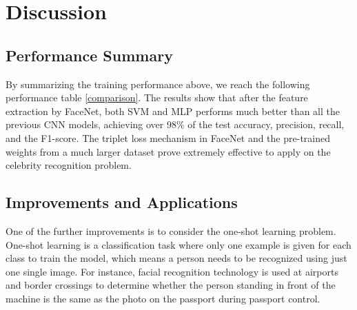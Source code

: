 \section{Discussion}
\subsection{Performance Summary}
By summarizing the training performance above, we reach the following performance table \ref{comparison}. The results show that after the feature extraction by FaceNet, both SVM and MLP performs much better than all the previous CNN models, achieving over 98\% of the test accuracy, precision, recall, and the F1-score. The triplet loss mechanism in FaceNet and the pre-trained weights from a much larger dataset prove extremely effective to apply on the celebrity recognition problem.
\begin{center}
    \small
    \label{comparison}
\end{center}

\subsection{Improvements and Applications}
One of the further improvements is to consider the one-shot learning problem. One-shot learning \cite{fei2006one} is a classification task where only one example is given for each class to train the model, which means a person needs to be recognized using just one single image. For instance, facial recognition technology is used at airports and border crossings to determine whether the person standing in front of the machine is the same as the photo on the passport during passport control. 

